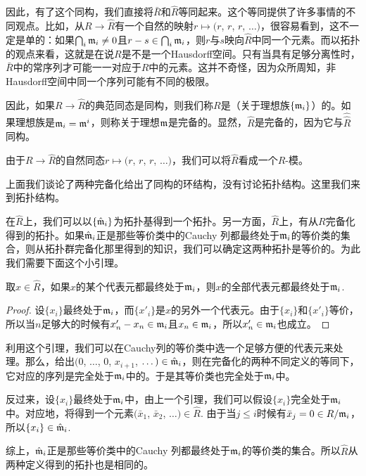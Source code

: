 因此，有了这个同构，我们直接将$\bar R$和$\hat R$等同起来。这个等同提供了许多事情的不同观点。比如，从$R\to \hat R$有一个自然的映射$r\mapsto (r$, $r$, $r$, $\dots)$，很容易看到，这不一定是单的：如果$\bigcap_i \mathfrak{m}_i\neq 0$且$r-s\in \bigcap_i \mathfrak{m}_i$，则$r$与$s$映向$\hat R$中同一个元素。而以拓扑的观点来看，这就是在说$R$是不是一个Hausdorff空间。只有当具有足够分离性时，$\bar R$中的常序列才可能一一对应于$R$中的元素。这并不奇怪，因为众所周知，非Hausdorff空间中同一个序列可能有不同的极限。

因此，如果$R\to \hat R$的典范同态是同构，则我们称$R$是（关于理想族$\{\mathfrak{m}_i\}$）的。如果理想族是$\mathfrak{m}_i=\mathfrak{m}^i$，则称关于理想$\mathfrak{m}$是完备的。显然，$\hat R$是完备的，因为它与$\hat{\hat R}$同构。

由于$R\to \hat R$的自然同态$r\mapsto (r$, $r$, $r$, $\dots)$，我们可以将$\hat R$看成一个$R$-模。

\begin{para}
上面我们谈论了两种完备化给出了同构的环结构，没有讨论拓扑结构。这里我们来到拓扑结构。

在$\hat R$上，我们可以以$\{\hat {\mathfrak{m}}_i\}$为拓扑基得到一个拓扑。另一方面，$\hat R$上，有从$R$完备化得到的拓扑。如果$\hat {\mathfrak{m}}_i$正是那些等价类中的Cauchy 列都最终处于$\mathfrak{m}_i$的等价类的集合，则从拓扑群完备化那里得到的知识，我们可以确定这两种拓扑是等价的。为此我们需要下面这个小引理。

\begin{lem}
取$x\in \hat R$，如果$x$的某个代表元都最终处于$\mathfrak{m}_i$，则$x$的全部代表元都最终处于$\mathfrak{m}_i$.
\end{lem}

\begin{proof}
设$\{x_i\}$最终处于$\mathfrak{m}_i$，而$\{x'_i\}$是$x$的另外一个代表元。由于$\{x_i\}$和$\{x'_i\}$等价，所以当$n$足够大的时候有$x'_n-x_n\in \mathfrak{m}_i$且$x_n\in \mathfrak{m}_i$，所以$x'_n\in \mathfrak{m}_i$也成立。
\end{proof}

利用这个引理，我们可以在Cauchy列的等价类中选一个足够方便的代表元来处理。那么，给出$(0$, $\dots$, $0$, $x_{i+1}$, $\dots)\in \hat{\mathfrak{m}}_i$，则在完备化的两种不同定义的等同下，它对应的序列是完全处于$\mathfrak{m}_i$中的。于是其等价类也完全处于$\mathfrak{m}_i$中。

反过来，设$\{x_i\}$最终处于$\mathfrak{m}_i$中，由上一个引理，我们可以假设$\{x_i\}$完全处于$\mathfrak{m}_i$中。对应地，将得到一个元素$(\bar{x}_1$, $\bar{x}_2$, $\dots)\in \hat{R}$. 由于当$j\leq i$时候有$\bar{x}_j=0 \in R/\mathfrak{m}_i$，所以$\{x_i\}\in \hat{\mathfrak{m}}_i$. 

综上，$\hat {\mathfrak{m}}_i$正是那些等价类中的Cauchy 列都最终处于$\mathfrak{m}_i$的等价类的集合。所以$\hat R$从两种定义得到的拓扑也是相同的。
\end{para}

